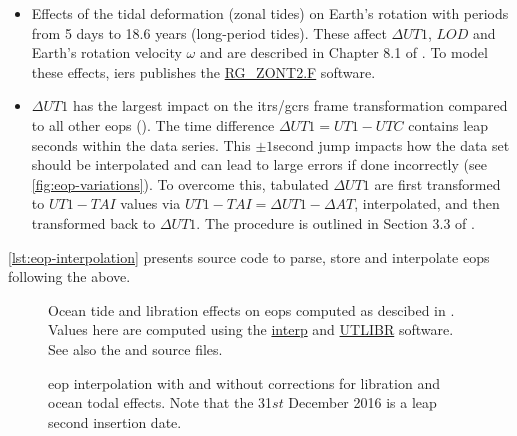 \begin{itemize}
\begin{itemize}
    \end{itemize}

    \item Effects of the tidal deformation (zonal tides) on Earth’s rotation with 
      periods from 5 days to 18.6 years (long-period tides). These affect 
      $\Delta UT1$, $LOD$ and Earth's rotation velocity $\omega$ and are 
      described in Chapter 8.1 of \cite{iers2010}. To model these effects, \gls{iers} 
      publishes the \href{https://iers-conventions.obspm.fr/content/chapter8/software/RG_ZONT2.F}{RG\_ZONT2.F} 
      software.

    \item $\Delta UT1$ has the largest impact on the \gls{itrs}/\gls{gcrs} frame 
      transformation compared to all other \glspl{eop} (\cite{Bradley2016}).  The 
      time difference $\Delta UT1 = UT1-UTC$ contains leap seconds within the data 
      series. This $\pm 1$second jump impacts how the data set should be 
      interpolated and can lead to large errors if done incorrectly (see \autoref{fig:eop-variations}). 
      To overcome this, tabulated $\Delta UT1$ are first transformed to $UT1-TAI$ 
      values via $UT1 - TAI = \Delta UT1 - \Delta AT$, interpolated, and then 
      transformed back to $\Delta UT1$. The procedure is outlined in Section 3.3 of 
      \cite{Bradley2016}.

\end{itemize}

\autoref{lst:eop-interpolation} presents source code to parse, store and 
interpolate \glspl{eop} following the above.

\begin{figure}[h]
  \centering
  
  \caption{Ocean tide and libration effects on \glspl{eop} computed as descibed in \cite{iers2010}. 
    Values here are computed using the \protect\href{https://hpiers.obspm.fr/iers/models/interp.f}{interp} and 
    \protect\href{https://iers-conventions.obspm.fr/content/chapter5/software/UTLIBR.F}{UTLIBR} software. 
    See also the  and  
    source files.}
  \label{fig:eop-variations}
\end{figure}

\begin{figure}[h]
  \centering
  
  \caption{\gls{eop} interpolation with and without corrections for libration and ocean todal effects. Note that the 31$st$ December 2016 is a leap second insertion date.}
  \label{fig:eop-interpolation}
\end{figure}

